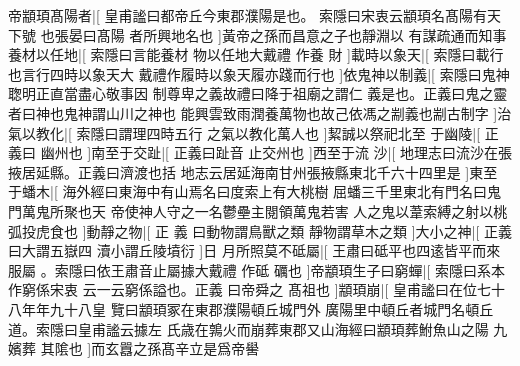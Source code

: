 帝顓頊髙陽者|[%
皇甫謐曰都帝丘今東郡濮陽是也。%
索隱曰宋衷云顓頊名髙陽有天下號%
%
也張晏曰髙陽%
者所興地名也%
]黃帝之孫而昌意之子也靜淵以%
%
有謀疏通而知事養材以任地|[%
索隱曰言能養材%
物以任地大戴禮%
%
作養%
財%
]載時以象天|[%
索隱曰載行也言行四時以象天大%
戴禮作履時以象天履亦踐而行也%
%
]依鬼神以制義|[%
索隱曰鬼神聦明正直當盡心敬事因%
制尊卑之義故禮曰降于祖廟之謂仁%
%
義是也。正義曰鬼之靈者曰神也鬼神謂山川之神也%
能興雲致雨潤養萬物也故己依馮之剬義也剬古制字%
]治%
%
氣以教化|[%
索隱曰謂理四時五行%
之氣以教化萬人也%
]絜誠以祭祀北至%
%
于幽陵|[%
正義曰%
幽州也%
]南至于交趾|[%
正義曰趾音%
止交州也%
]西至于流%
%
沙|[%
地理志曰流沙在張掖居延縣。正義曰濟渡也括%
地志云居延海南甘州張掖縣東北千六十四里是%
]東至%
%
于蟠木|[%
海外經曰東海中有山焉名曰度索上有大桃樹%
屈蟠三千里東北有門名曰鬼門萬鬼所聚也天%
%
帝使神人守之一名鬱壘主閱領萬鬼若害%
人之鬼以葦索縛之射以桃弧投虎食也%
]動靜之物|[%
正%
義%
%
曰動物謂鳥獸之類%
靜物謂草木之類%
]大小之神|[%
正義曰大謂五嶽四%
瀆小謂丘陵墳衍%
]日%
%
月所照莫不砥屬|[%
王肅曰砥平也四逺皆平而來服屬%
。索隱曰依王肅音止屬據大戴禮%
%
作砥%
礪也%
]帝顓頊生子曰窮蟬|[%
索隱曰系本作窮係宋衷%
云一云窮係謚也。正義%
%
曰帝舜之%
髙祖也%
]顓頊崩|[%
皇甫謐曰在位七十八年年九十八皇%
覽曰顓頊冢在東郡濮陽頓丘城門外%
%
廣陽里中頓丘者城門名頓丘道。索隱曰皇甫謐云據左%
氏歳在鶉火而崩葬東郡又山海經曰顓頊葬鮒魚山之陽%
%
九嬪葬%
其隂也%
]而玄囂之孫髙辛立是爲帝嚳%
